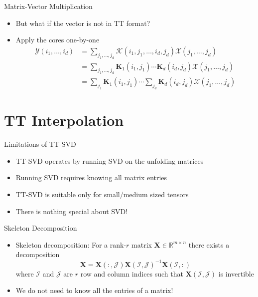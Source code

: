 \documentclass[aspectratio=169]{beamer}
\newcommand{\Mat}[1]{\mathbf{#1}}
\newcommand{\Tns}[1]{\mathcal{#1}}
\newcommand{\RR}{\mathbb{R}}
\begin{document}
\begin{frame}{Matrix-Vector Multiplication}
  \begin{itemize}
    \item
      But what if the vector is not in TT format?
    \item
      Apply the cores one-by-one
      \begin{equation*}
        \begin{split}
          \Tns{Y}(i_1, \ldots, i_d)
          &= \sum_{j_1, \ldots, j_d} \Tns{K}(i_1, j_1, \ldots, i_d, j_d)
          \Tns{X}(j_1, \ldots, j_d) \\
          &= \sum_{j_1, \ldots, j_d} \Mat{K}_1(i_1, j_1) \cdots \Mat{K}_d(i_d,
          j_d) \Tns{X}(j_1, \ldots, j_d) \\
          &= \sum_{j_1} \Mat{K}_1(i_1, j_1) \cdots \sum_{j_d} \Mat{K}_d(i_d,
          j_d) \Tns{X}(j_1, \ldots, j_d)
        \end{split}
      \end{equation*}
  \end{itemize}
\end{frame}

\section{TT Interpolation}

\begin{frame}{Limitations of TT-SVD}
  \begin{itemize}
    \item
      TT-SVD operates by running SVD on the unfolding matrices
    \item
      Running SVD requires knowing {\color{red} all} matrix entries
    \item
      TT-SVD is suitable only for small/medium sized tensors
    \item
      There is nothing special about SVD!
  \end{itemize}
\end{frame}

\begin{frame}{Skeleton Decomposition}
  \begin{itemize}
    \item
      Skeleton decomposition: For a rank-$r$ matrix $\Mat{X} \in \RR^{m \times
      n}$ there exists a decomposition
      \begin{equation*}
        \Mat{X} = \Mat{X}(:, \mathcal{J}) \Mat{X}(\mathcal{I}, \mathcal{J})^{-1}
        \Mat{X}(\mathcal{I}, :)
      \end{equation*}
      where $\mathcal{I}$ and $\mathcal{J}$ are $r$ row and column indices such
      that $\Mat{X}(\mathcal{I}, \mathcal{J})$ is invertible
    \item
      We do not need to know all the entries of a matrix!
  \end{itemize}
\end{frame}
\end{document}
